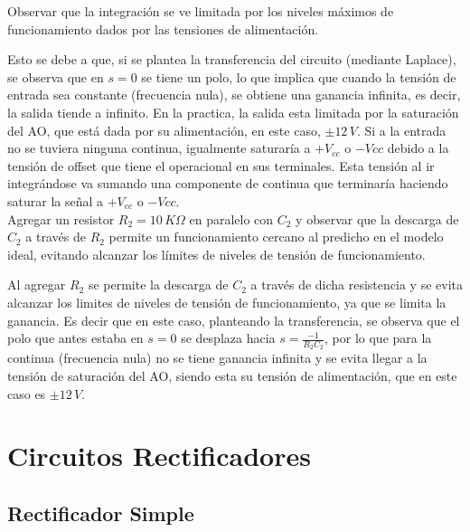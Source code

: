 \documentclass[10pt,spanish,a4paper,openany,notitlepage]{article}
\begin{document}
{\color{OliveGreen}Observar que la integración se ve limitada por los niveles máximos de funcionamiento dados por las tensiones de alimentación.}

Esto se debe a que, si se plantea la transferencia del circuito (mediante Laplace), se observa que en $s=0$ se tiene un polo, lo que implica que cuando la tensión de entrada sea constante (frecuencia nula), se obtiene una ganancia infinita, es decir, la salida tiende a infinito. En la practica, la salida esta limitada por la saturación del AO, que está dada por su alimentación, en este caso,  $\pm 12\, \unit{V}$. Si a la entrada no se tuviera ninguna continua, igualmente saturaría a $+V_{cc}$ o $-V{cc}$ debido a la tensión de offset que tiene el operacional en sus terminales. Esta tensión al ir integrándose va sumando una componente de continua que terminaría haciendo saturar la señal a $+V_{cc}$  o $-V{cc}$.\\

{\color{OliveGreen}Agregar un resistor $R_2 = 10\,\unit{K\Omega}$ en paralelo con $C_2$ y observar que la descarga de $C_2$ a través de $R_2$ permite un funcionamiento cercano al predicho en el modelo ideal, evitando alcanzar los límites de niveles de tensión de funcionamiento.}
 
Al agregar $R_2$ se permite la descarga de $C_2$ a través de dicha resistencia y se evita alcanzar los limites de niveles de tensión de funcionamiento, ya que se limita la ganancia. 
Es decir que en este caso, planteando la transferencia, se observa que el polo que antes estaba en $s=0$ se desplaza hacia $s= \frac{-1}{R_2 C_2}$, por lo que para la continua (frecuencia nula) no se tiene ganancia infinita y se evita llegar a la tensión de saturación del AO, siendo esta su tensión de alimentación, que en este caso es $\pm 12\, \unit{V}$.


\section{Circuitos Rectificadores}

\subsection{Rectificador Simple}
\end{document}
